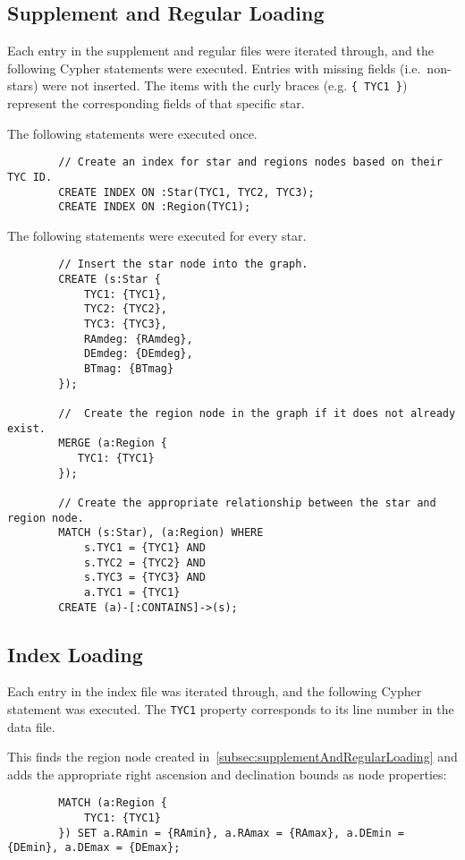 \documentclass[11pt]{article}
\begin{document}
    \subsection{Supplement and Regular Loading}\label{subsec:supplementAndRegularLoading}
    Each entry in the supplement and regular files were iterated through, and the following Cypher statements
    were executed.
    Entries with missing fields (i.e.\ non-stars) were not inserted.
    The items with the curly braces  (e.g. \texttt{\{ TYC1 \}}) represent the corresponding fields of that
    specific star.

    The following statements were executed once.
    \begin{lstlisting}
        // Create an index for star and regions nodes based on their TYC ID.
        CREATE INDEX ON :Star(TYC1, TYC2, TYC3);
        CREATE INDEX ON :Region(TYC1);
    \end{lstlisting}

    The following statements were executed for every star.
    \begin{lstlisting}
        // Insert the star node into the graph.
        CREATE (s:Star {
            TYC1: {TYC1},
            TYC2: {TYC2},
            TYC3: {TYC3},
            RAmdeg: {RAmdeg},
            DEmdeg: {DEmdeg},
            BTmag: {BTmag}
        });

        //  Create the region node in the graph if it does not already exist.
        MERGE (a:Region {
           TYC1: {TYC1}
        });

        // Create the appropriate relationship between the star and region node.
        MATCH (s:Star), (a:Region) WHERE
            s.TYC1 = {TYC1} AND
            s.TYC2 = {TYC2} AND
            s.TYC3 = {TYC3} AND
            a.TYC1 = {TYC1}
        CREATE (a)-[:CONTAINS]->(s);
    \end{lstlisting}

    \subsection{Index Loading}\label{subsec:indexLoading}
    Each entry in the index file was iterated through, and the following Cypher statement was executed.
    The \texttt{TYC1} property corresponds to its line number in the data file.

    This finds the region node created in~\autoref{subsec:supplementAndRegularLoading} and adds the appropriate
    right ascension and declination bounds as node properties:
    \begin{lstlisting}
        MATCH (a:Region {
            TYC1: {TYC1}
        }) SET a.RAmin = {RAmin}, a.RAmax = {RAmax}, a.DEmin = {DEmin}, a.DEmax = {DEmax};
    \end{lstlisting}
\end{document}
